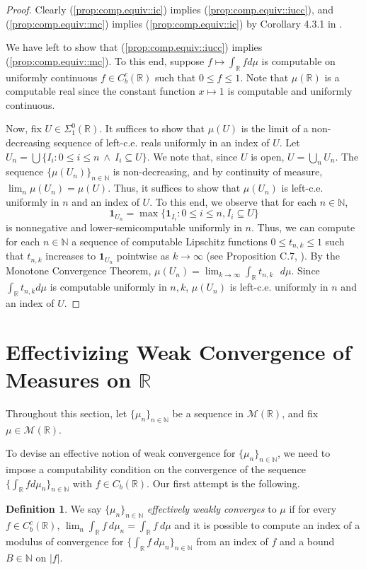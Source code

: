 \documentclass{amsart}
\newcommand{\R}{\mathbb{R}}
\newcommand{\N}{\mathbb{N}}
\newcommand{\M}{\mathcal{M}}
\newcommand{\one}{\mathbf{1}}
\theoremstyle{definition}
\newtheorem{definition}[theorem]{Definition}
\numberwithin{equation}{section}
\begin{document}
\begin{proof}
Clearly (\ref{prop:comp.equiv::ic}) implies (\ref{prop:comp.equiv::iucc}), and (\ref{prop:comp.equiv::mc}) implies (\ref{prop:comp.equiv::ic}) by Corollary 4.3.1 in \cite{HR09b}.

We have left to show that (\ref{prop:comp.equiv::iucc}) implies (\ref{prop:comp.equiv::mc}). 
To this end, suppose $f\mapsto\int_{\R}fd\mu$ is computable on uniformly continuous $f\in C^c_b(\R)$ such that $0\leq f\leq1$. 
Note that $\mu(\R)$ is a computable real since the constant function $x\mapsto1$ is computable and uniformly continuous. 

Now, fix $U\in\Sigma^0_1(\R)$.
It suffices to show that $\mu(U)$ is the limit of a non-decreasing sequence of left-c.e. reals uniformly in an index of $U$. 
Let $U_n=\bigcup\{I_i: 0\leq i\leq n\ \wedge\ I_i \subseteq U\}$. 
We note that, since $U$ is open, $U= \bigcup_n U_n$.  The sequence $\{\mu(U_n)\}_{n \in \N}$ is non-decreasing, and by continuity of measure, $\lim_n \mu(U_n) = \mu(U)$.  Thus, it suffices to show that $\mu(U_n)$ is left-c.e. uniformly in $n$ and an index of $U$.
To this end, we observe that for each $n\in\N$, 
\[
\one_{U_n}=\max\{\one_{I_i}:0\leq i\leq n, I_i\subseteq U\}
\] 
is nonnegative and lower-semicomputable uniformly in $n$. 
Thus, we can compute for each $n\in\N$ a sequence of computable Lipschitz functions $0\leq t_{n,k}\leq1$ such that $t_{n,k}$ increases to $\one_{U_n}$ pointwise as $k\rightarrow\infty$ (see Proposition C.7, \cite{G05}).
By the Monotone Convergence Theorem, $\mu(U_n)=\lim_{k\rightarrow\infty}\int_{\R}t_{n,k}\mbox{ }d\mu$.  
Since $\int_\R t_{n,k} d\mu$ is computable uniformly in $n,k$, $\mu(U_n)$ is left-c.e. uniformly in $n$ and an index of $U$.  
\end{proof}

\section{Effectivizing Weak Convergence of Measures on $\R$}

Throughout this section, let $\{\mu_n\}_{n\in\N}$ be a sequence in $\M(\R)$, and fix $\mu\in\M(\R)$.

To devise an effective notion of weak convergence for $\{\mu_n\}_{n\in\N}$, we need to impose a computability condition on the convergence of the sequence $\{\int_{\R}fd\mu_n\}_{n\in\N}$ with $f\in C_b(\R)$.  Our first attempt is the following.

\begin{definition}\label{def:ew}
We say $\{\mu_n\}_{n\in\N}$ \emph{effectively weakly converges} to $\mu$ if for every $f \in C_b^c(\R)$, 
$\lim_n \int_\R f\ d\mu_n = \int_\R f\ d\mu$ and it is possible to compute an index of a modulus of convergence for 
$\{\int_\R f\ d\mu_n\}_{n \in \N}$ from an index of $f$ and a bound $B \in \N$ on $|f|$. 
\end{definition}
\end{document}
